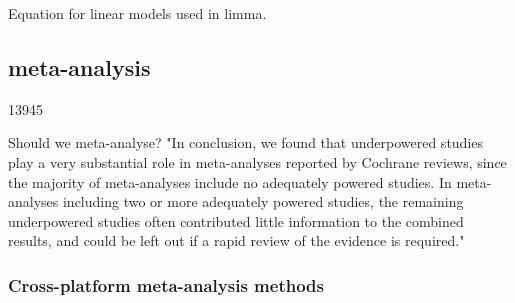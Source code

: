 Equation for linear models used in limma.

\subsection{ meta-analysis}

13945

Should we meta-analyse?
"In conclusion, we found that underpowered studies play a very substantial role in meta-analyses reported by Cochrane reviews, since the majority of meta-analyses include no adequately powered studies. In meta-analyses including two or more adequately powered studies, the remaining underpowered studies often contributed little information to the combined results, and could be left out if a rapid review of the evidence is required."

\subsubsection{Cross-platform meta-analysis methods}

